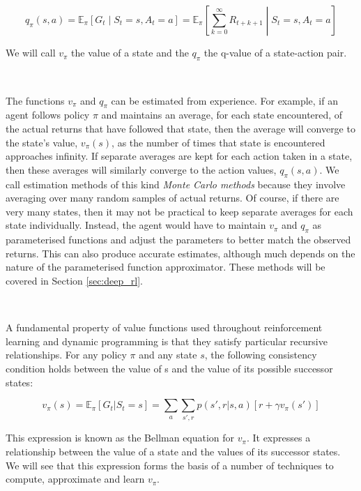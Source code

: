 \documentclass{article}
\begin{document}
\begin{equation}
	q_\pi(s, a) = \mathbb{E}_\pi \left[ G_t  \middle| S_t = s, A_t = a\right] = \mathbb{E}_\pi \left[ \sum_{k=0}^\infty R_{t + k + 1} \middle| S_t = s, A_t = a\right]
\end{equation}

We will call $v_\pi$ the value of a state and the $q_\pi$ the q-value of a state-action pair.

\

The functions $v_\pi$ and $q_\pi$ can be estimated from experience. For example, if an agent follows policy $\pi$ and maintains an average, for each state encountered, of the actual returns that have followed that state, then the average will converge to the state’s value, $v_\pi(s)$, as the number of times that state is encountered approaches infinity. If separate averages are kept for each action taken in a state, then these averages will similarly converge to the action values, $q_\pi(s, a)$. We call estimation methods of this kind \textit{Monte Carlo methods} because they involve averaging over many random samples of actual returns. Of course, if there are very many states, then it may not be practical to keep separate averages for each state individually. Instead, the agent would have to maintain $v_\pi$ and $q_\pi$ as parameterised functions and adjust the parameters to better match the observed returns. This can also produce accurate estimates, although much depends on the nature of the parameterised function approximator. These methods will be covered in Section \ref{sec:deep_rl}.

\

A fundamental property of value functions used throughout reinforcement learning and dynamic programming is that they satisfy particular recursive relationships. For any policy $\pi$ and any state $s$, the following consistency condition holds between the value of s and the value of its possible successor states:

\begin{equation}\label{eq:bellman_equation}
	v_\pi(s) = \mathbb{E}_\pi [ G_t | S_t = s ] = \sum_a \sum_{s', r} p(s', r | s, a) \left[ r + \gamma v_\pi(s') \right]
\end{equation}

This expression is known as the Bellman equation for $v_\pi$. It expresses a relationship between the value of a state and the values of its successor states. We will see that this expression forms the basis of a number of techniques to compute, approximate and learn $v_\pi$.
\end{document}
